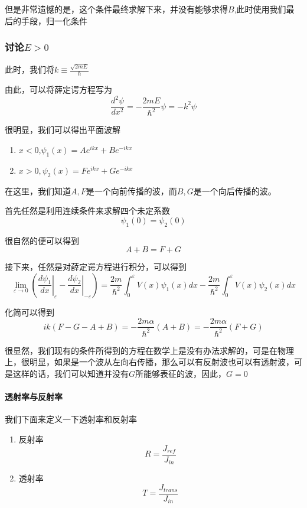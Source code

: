 \documentclass{article}
\begin{document}
但是非常遗憾的是，这个条件最终求解下来，并没有能够求得$B$,此时使用我们最后的手段，归一化条件




\subsubsection{讨论$E>0$}

此时，我们将$k\equiv \frac{\sqrt{2mE}}{\hbar}$

由此，可以将薛定谔方程写为
\[
    \frac{d^2\psi}{dx^2}=-\frac{2mE}{\hbar^2}\psi=-k^2\psi
\]

很明显，我们可以得出平面波解
\begin{center}
    \begin{enumerate}
    \item $x<0$,$\psi_1(x)=Ae^{ikx}+Be^{-ikx}$
    \item $x>0,\psi_2(x)=Fe^{ikx}+Ge^{-ikx}$
\end{enumerate}
\end{center}


在这里，我们知道$A,F$是一个向前传播的波，而$B,G$是一个向后传播的波。

首先任然是利用连续条件来求解四个未定系数
\[\psi_1(0)=\psi_2(0)\]

很自然的便可以得到
\[A+B=F+G\]

接下来，任然是对薛定谔方程进行积分，可以得到
\[
    \lim_{\varepsilon\to0}\left(\left.\frac{d\psi_1}{dx}\right|_{\varepsilon}-\left.\frac{d\psi_2}{dx}\right|_{-\varepsilon}\right)=\frac{2m}{\hbar^2}\int_{0}^{\varepsilon}V(x)\psi_1(x)dx-\frac{2m}{\hbar^2}\int_{0}^{\varepsilon}V(x)\psi_2(x)dx
\]

化简可以得到
\[ik(F-G-A+B)=-\frac{2m\alpha}{\hbar^2}(A+B)=-\frac{2m\alpha}{\hbar^2}(F+G)\]

很显然，我们现有的条件所得到的方程在数学上是没有办法求解的，可是在物理上，很明显，如果是一个波从左向右传播，那么可以有反射波也可以有透射波，可是这样的话，我们可以知道并没有$G$所能够表征的波，因此，$G=0$


\paragraph{透射率与反射率}

我们下面来定义一下透射率和反射率
\begin{enumerate}
    \item 反射率\[R=\frac{J_{ref}}{J_{in}}\]
    \item 透射率\[T=\frac{J_{trans}}{J_{in}}\]
\end{enumerate}
\end{document}
